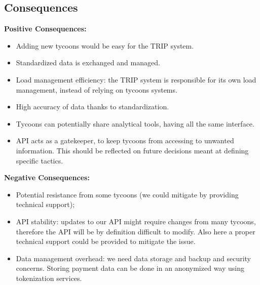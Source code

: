 \subsection*{Consequences}
\textbf{Positive Consequences:}
\begin{itemize}
    \item Adding new tycoons would be easy for the TRIP system.
    \item Standardized data is exchanged and managed.
    \item Load management efficiency: the TRIP system is responsible for its own load management, instead of relying on tycoons systems.
    \item High accuracy of data thanks to standardization.
    \item Tycoons can potentially share analytical tools, having all the same interface.
    \item API acts as a gatekeeper, to keep tycoons from accessing to unwanted information. This should be reflected on future decisions meant at defining specific tactics.
\end{itemize}
\textbf{Negative Consequences:}
\begin{itemize}
    \item Potential resistance from some tycoons (we could mitigate by providing technical support);
    \item API stability: updates to our API might require changes from many tycoons, therefore the API will be by definition difficult to modify. Also here a proper technical support could be provided to mitigate the issue.
    \item Data management overhead: we need data storage and backup and security concerns. Storing payment data can be done in an anonymized way using tokenization services.
\end{itemize}